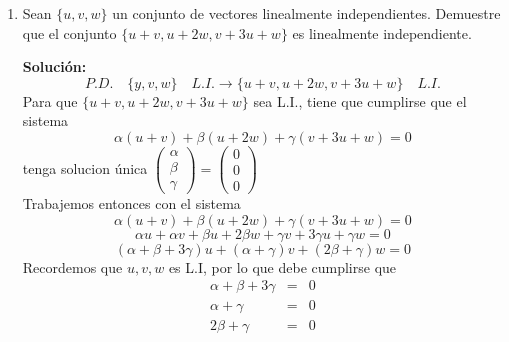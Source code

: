 \documentclass[12pt]{article}
\newenvironment{solucion}
{\begin{mdframed}[backgroundcolor=black!10]
		{\bf Solución:}\\
	}
	{
	\end{mdframed}
}
\newenvironment{preguntas}
{\begin{enumerate}\itemsep12pt
	}
	{
	\end{enumerate}
}
\newcommand{\ra}{\rightarrow}
\begin{document}
\begin{preguntas}
\begin{solucion}
		$$3\alpha - 6\beta = 0$$
		Es decir, la condición para $\alpha$ y $\beta$, tal que 
		$$\begin{pmatrix}
		\alpha-\beta\\
		\alpha + \beta\\
		2\alpha - \beta
		\end{pmatrix} \in Gen\left\{\begin{pmatrix}
		-1\\
		-1\\
		1
		\end{pmatrix}\, \begin{pmatrix}
		1\\
		2\\
		1
		\end{pmatrix}, \begin{pmatrix}
		1\\
		3\\
		3
		\end{pmatrix}\right\}$$
		es $\alpha = 2\beta$
\end{solucion}
\item Sean $\{u, v, w\}$ un conjunto de vectores linealmente independientes. Demuestre que el conjunto $\{u+v, u+2w, v+3u+w\}$ es linealmente independiente.
\begin{solucion}
$$P.D. \quad \{y, v, w\}\quad L.I. \ra \{u+v, u+2w, v+3u+w\}\quad L.I.$$
		Para que $\{u+v, u+2w, v+3u+w\}$ sea L.I., tiene que cumplirse que el sistema
		$$\alpha(u+v) + \beta(u+2w) + \gamma(v+3u+w) = 0$$
		tenga solucion única $\begin{pmatrix}
		\alpha\\ \beta \\ \gamma
		\end{pmatrix} = \begin{pmatrix} 0\\0\\0\end{pmatrix}$\\
		Trabajemos entonces con el sistema
		$$\alpha(u+v) + \beta(u+2w) + \gamma(v+3u+w) = 0$$
		$$\alpha u+ \alpha v + \beta u+2\beta w + \gamma v+3\gamma u+\gamma w = 0$$
		$$(\alpha + \beta + 3 \gamma)u + (\alpha + \gamma)v + (2\beta + \gamma)w = 0$$
		Recordemos que ${u, v, w}$ es L.I, por lo que debe cumplirse que
		$$\begin{array}{rcl}
		\alpha + \beta + 3 \gamma & = & 0\\
		\alpha + \gamma & = & 0\\
		2\beta + \gamma & = & 0
		\end{array}$$

\end{solucion}
\end{preguntas}
\end{document}
